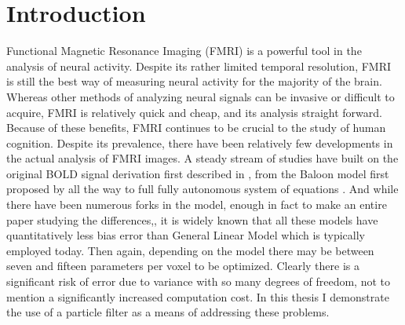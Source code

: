 \documentclass{article}
\begin{document}
\section{Introduction}
Functional Magnetic Resonance Imaging (FMRI) is a powerful tool in the analysis
of neural activity. Despite its rather limited temporal resolution, FMRI is still
the best way of measuring neural activity for the majority of the brain.
Whereas other methods
of analyzing neural signals can be invasive or difficult to acquire, 
FMRI is relatively quick and cheap, and its analysis straight forward.
Because of these benefits, FMRI continues to be crucial to the study of human 
cognition. Despite its prevalence, there have been relatively few developments
in the actual analysis of FMRI images. A steady stream of studies have built
on the original BOLD signal derivation first described in \cite{Ogawa}, 
from the Baloon model first proposed by \cite{Buxton1998}
all the way to full fully autonomous system of equations \cite{Riera2004}. And while
there have been numerous forks in the model, enough in fact to make an entire paper
studying the differences,\cite{Deneux2006}, it is widely known that all these
models have quantitatively less bias error than General Linear Model which is
typically employed today. Then again, depending on the model there may be between
seven \cite{Riera2004} and fifteen \cite{Zheng2005} parameters per voxel to
be optimized. Clearly there is a significant risk of error due to variance
with so many degrees of freedom, not to mention a significantly increased
computation cost. In this thesis I demonstrate the use of a 
particle filter as a means of addressing these problems.
\end{document}
